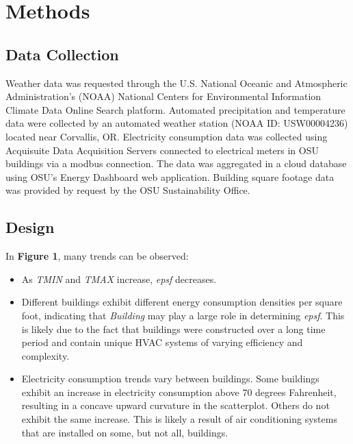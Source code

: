 \documentclass[
]{article}
\providecommand{\tightlist}{%
  \setlength{\itemsep}{0pt}\setlength{\parskip}{0pt}}
\begin{document}
\hypertarget{methods}{%
\section{Methods}\label{methods}}

\hypertarget{data-collection}{%
\subsection{Data Collection}\label{data-collection}}

Weather data was requested through the U.S. National Oceanic and
Atmospheric Administration's (NOAA) National Centers for Environmental
Information Climate Data Online Search platform. Automated precipitation
and temperature data were collected by an automated weather station
(NOAA ID: USW00004236) located near Corvallis, OR. Electricity
consumption data was collected using Acquisuite Data Acquisition Servers
connected to electrical meters in OSU buildings via a modbus connection.
The data was aggregated in a cloud database using OSU's Energy Dashboard
web application. Building square footage data was provided by request by
the OSU Sustainability Office.

\hypertarget{design}{%
\subsection{Design}\label{design}}

In \textbf{Figure 1}, many trends can be observed:

\begin{itemize}
\tightlist
\item
  As \emph{TMIN} and \emph{TMAX} increase, \emph{epsf} decreases.
\item
  Different buildings exhibit different energy consumption densities per
  square foot, indicating that \emph{Building} may play a large role in
  determining \emph{epsf}. This is likely due to the fact that buildings
  were constructed over a long time period and contain unique HVAC
  systems of varying efficiency and complexity.
\item
  Electricity consumption trends vary between buildings. Some buildings
  exhibit an increase in electricity consumption above 70 degrees
  Fahrenheit, resulting in a concave upward curvature in the
  scatterplot. Others do not exhibit the same increase. This is likely a
  result of air conditioning systems that are installed on some, but not
  all, buildings.
\end{itemize}
\end{document}
